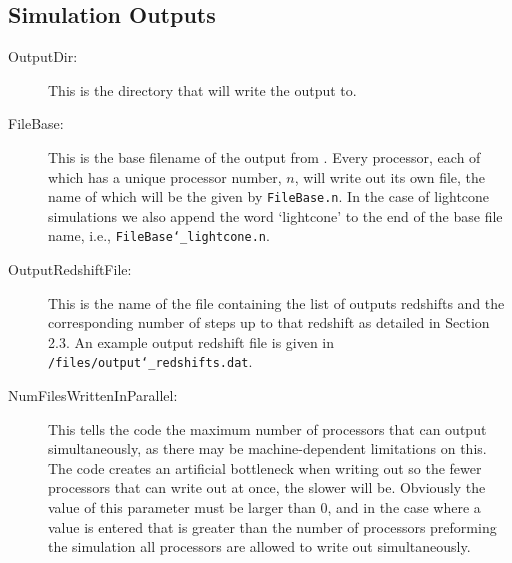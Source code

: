 \documentclass[12pt,twoside,a4paper]{article}
\begin{document}
\subsection{Simulation Outputs}
\begin{description}
\item[OutputDir:]{This is the directory that {\PICOLA} will write the output to.}
\item[FileBase:]{This is the base filename of the output from {\PICOLA}. Every processor, each of which has a unique processor number, $n$, will write out its own file, the name of which will be the given by \texttt{FileBase.n}. In the case of lightcone simulations we also append the word `lightcone' to the end of the base file name, i.e., \texttt{FileBase\char`_lightcone.n}.}
\item[OutputRedshiftFile:]{This is the name of the file containing the list of outputs redshifts and the corresponding number of steps up to that redshift as detailed in Section 2.3. An example output redshift file is given in \texttt{/files/output\char`_redshifts.dat}.}
\item[NumFilesWrittenInParallel:]{This tells the code the maximum number of processors that can output simultaneously, as there may be machine-dependent limitations on this. The code creates an artificial bottleneck when writing out so the fewer processors that can write out at once, the slower {\PICOLA} will be. Obviously the value of this parameter must be larger than $0$, and in the case where a value is entered that is greater than the number of processors preforming the simulation all processors are allowed to write out simultaneously.}
\end{description}
\end{document}
